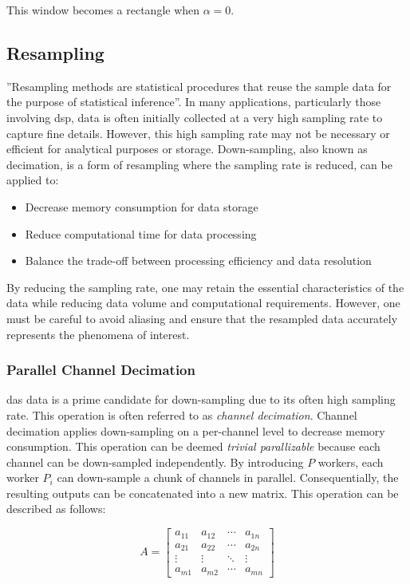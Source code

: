 This window becomes a rectangle when $\alpha = 0$.


\subsection{Resampling}

''Resampling methods are statistical procedures that reuse the sample data for the purpose of statistical inference''\cite{https://doi.org/10.1002/widm.1054}. In many applications, particularly those involving \acrshort{dsp}, data is often initially collected at a very high sampling rate to capture fine details. However, this high sampling rate may not be necessary or efficient for analytical purposes or storage. Down-sampling, also known as decimation, is a form of resampling where the sampling rate is reduced, can be applied to:

\begin{itemize}
    \item Decrease memory consumption for data storage
    \item Reduce computational time for data processing
    \item Balance the trade-off between processing efficiency and data resolution
\end{itemize}

By reducing the sampling rate, one may retain the essential characteristics of the data while reducing data volume and computational requirements. However, one must be careful to avoid aliasing and ensure that the resampled data accurately represents the phenomena of interest. 

\subsubsection{Parallel Channel Decimation}

\acrshort{das} data is a prime candidate for down-sampling due to its often high sampling rate. This operation is often referred to as \textit{channel decimation}. Channel decimation applies down-sampling on a per-channel level to decrease memory consumption. This operation can be deemed \textit{trivial parallizable} because each channel can be down-sampled independently. By introducing $P$ workers, each worker $P_i$ can down-sample a chunk of channels in parallel. Consequentially, the resulting outputs can be concatenated into a new matrix. This operation can be described as follows:

\[
A = \begin{bmatrix}
a_{11} & a_{12} & \cdots & a_{1n} \\
a_{21} & a_{22} & \cdots & a_{2n} \\
\vdots & \vdots & \ddots & \vdots \\
a_{m1} & a_{m2} & \cdots & a_{mn}
\end{bmatrix}
\]

